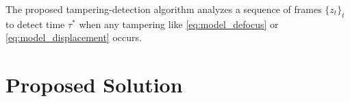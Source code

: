 \documentclass{llncs}
\begin{document}
The proposed tampering-detection algorithm analyzes a sequence of frames $\{z_t\}_t$ to detect time $\tau^*$ when any tampering like \eqref{eq:model_defocus} or \eqref{eq:model_displacement} occurs.



\section{Proposed Solution}\label{sec:propSol}
\end{document}
